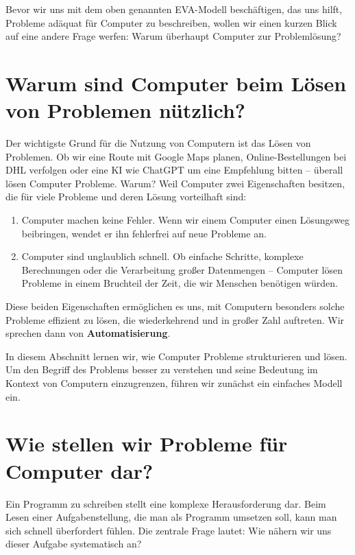 \documentclass[
  ngerman,
  letterpaper,
  DIV=11]{scrreprt}
\providecommand{\tightlist}{%
  \setlength{\itemsep}{0pt}\setlength{\parskip}{0pt}}
\begin{document}
Bevor wir uns mit dem oben genannten EVA-Modell beschäftigen, das uns
hilft, Probleme adäquat für Computer zu beschreiben, wollen wir einen
kurzen Blick auf eine andere Frage werfen: Warum überhaupt Computer zur
Problemlösung?

\section{Warum sind Computer beim Lösen von Problemen
nützlich?}\label{warum-sind-computer-beim-luxf6sen-von-problemen-nuxfctzlich}

Der wichtigste Grund für die Nutzung von Computern ist das Lösen von
Problemen. Ob wir eine Route mit Google Maps planen, Online-Bestellungen
bei DHL verfolgen oder eine KI wie ChatGPT um eine Empfehlung bitten --
überall lösen Computer Probleme. Warum? Weil Computer zwei Eigenschaften
besitzen, die für viele Probleme und deren Lösung vorteilhaft sind:

\begin{enumerate}
\def\labelenumi{\arabic{enumi}.}
\tightlist
\item
  Computer machen keine Fehler. Wenn wir einem Computer einen Lösungsweg
  beibringen, wendet er ihn fehlerfrei auf neue Probleme an.
\item
  Computer sind unglaublich schnell. Ob einfache Schritte, komplexe
  Berechnungen oder die Verarbeitung großer Datenmengen -- Computer
  lösen Probleme in einem Bruchteil der Zeit, die wir Menschen benötigen
  würden.
\end{enumerate}

Diese beiden Eigenschaften ermöglichen es uns, mit Computern besonders
solche Probleme effizient zu lösen, die wiederkehrend und in großer Zahl
auftreten. Wir sprechen dann von \textbf{Automatisierung}.

In diesem Abschnitt lernen wir, wie Computer Probleme strukturieren und
lösen. Um den Begriff des Problems besser zu verstehen und seine
Bedeutung im Kontext von Computern einzugrenzen, führen wir zunächst ein
einfaches Modell ein.

\section{Wie stellen wir Probleme für Computer
dar?}\label{sec-eva-model}

Ein Programm zu schreiben stellt eine komplexe Herausforderung dar. Beim
Lesen einer Aufgabenstellung, die man als Programm umsetzen soll, kann
man sich schnell überfordert fühlen. Die zentrale Frage lautet: Wie
nähern wir uns dieser Aufgabe systematisch an?
\end{document}
